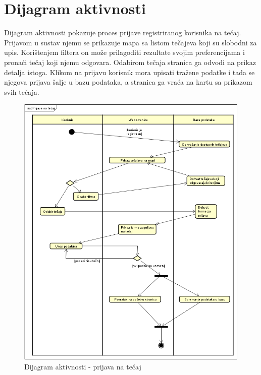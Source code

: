 			
		
		\section{Dijagram aktivnosti}

            \noindent Dijagram aktivnosti pokazuje proces prijave registriranog korisnika na tečaj. Prijavom u sustav njemu se prikazuje mapa sa listom tečajeva koji su slobodni za upis. Korištenjem filtera on može prilagoditi rezultate svojim preferencijama i pronaći tečaj koji njemu odgovara. Odabirom tečaja stranica ga odvodi na prikaz detalja istoga. Klikom na prijavu korisnik mora upisati tražene podatke i tada se njegova prijava šalje u bazu podataka, a stranica ga vraća na kartu sa prikazom svih tečaja. 

            \begin{figure}[H]
			\includegraphics[scale=0.8]{slike/DijagramAktivnosti.PNG} %
			\centering
			\caption{Dijagram aktivnosti - prijava na tečaj}
			\label{fig:stanje}
		\end{figure}
		
